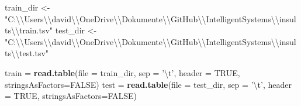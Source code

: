 \documentclass[]{article}
\newenvironment{Shaded}{\begin{snugshade}}{\end{snugshade}}
\newcommand{\CharTok}[1]{\textcolor[rgb]{0.31,0.60,0.02}{#1}}
\newcommand{\DataTypeTok}[1]{\textcolor[rgb]{0.13,0.29,0.53}{#1}}
\newcommand{\KeywordTok}[1]{\textcolor[rgb]{0.13,0.29,0.53}{\textbf{#1}}}
\newcommand{\NormalTok}[1]{#1}
\newcommand{\OtherTok}[1]{\textcolor[rgb]{0.56,0.35,0.01}{#1}}
\newcommand{\StringTok}[1]{\textcolor[rgb]{0.31,0.60,0.02}{#1}}
\begin{document}
\begin{Shaded}
\begin{Highlighting}[]
\NormalTok{train_dir <-}\StringTok{ "C:}\CharTok{\textbackslash{}\textbackslash{}}\StringTok{Users}\CharTok{\textbackslash{}\textbackslash{}}\StringTok{david}\CharTok{\textbackslash{}\textbackslash{}}\StringTok{OneDrive}\CharTok{\textbackslash{}\textbackslash{}}\StringTok{Dokumente}\CharTok{\textbackslash{}\textbackslash{}}\StringTok{GitHub}\CharTok{\textbackslash{}\textbackslash{}}\StringTok{IntelligentSystems}\CharTok{\textbackslash{}\textbackslash{}}\StringTok{insults}\CharTok{\textbackslash{}\textbackslash{}}\StringTok{train.tsv"}
\NormalTok{test_dir <-}\StringTok{ "C:}\CharTok{\textbackslash{}\textbackslash{}}\StringTok{Users}\CharTok{\textbackslash{}\textbackslash{}}\StringTok{david}\CharTok{\textbackslash{}\textbackslash{}}\StringTok{OneDrive}\CharTok{\textbackslash{}\textbackslash{}}\StringTok{Dokumente}\CharTok{\textbackslash{}\textbackslash{}}\StringTok{GitHub}\CharTok{\textbackslash{}\textbackslash{}}\StringTok{IntelligentSystems}\CharTok{\textbackslash{}\textbackslash{}}\StringTok{insults}\CharTok{\textbackslash{}\textbackslash{}}\StringTok{test.tsv"}

\NormalTok{train =}\StringTok{ }\KeywordTok{read.table}\NormalTok{(}\DataTypeTok{file =}\NormalTok{ train_dir, }\DataTypeTok{sep =} \StringTok{'}\CharTok{\textbackslash{}t}\StringTok{'}\NormalTok{, }\DataTypeTok{header =} \OtherTok{TRUE}\NormalTok{, }\DataTypeTok{stringsAsFactors=}\OtherTok{FALSE}\NormalTok{)}
\NormalTok{test =}\StringTok{ }\KeywordTok{read.table}\NormalTok{(}\DataTypeTok{file =}\NormalTok{ test_dir, }\DataTypeTok{sep =} \StringTok{'}\CharTok{\textbackslash{}t}\StringTok{'}\NormalTok{, }\DataTypeTok{header =} \OtherTok{TRUE}\NormalTok{, }\DataTypeTok{stringsAsFactors=}\OtherTok{FALSE}\NormalTok{)}


\end{Highlighting}
\end{Shaded}
\end{document}

